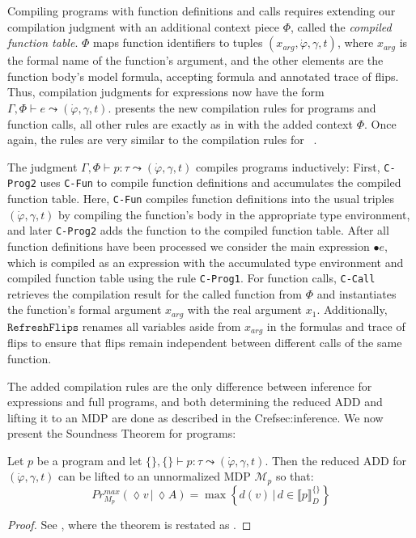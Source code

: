 %
Compiling programs with function definitions and calls requires extending our compilation judgment with an additional context piece $\Phi$, called the \textit{compiled function table}.
$\Phi$ maps function identifiers to tuples $(x_{arg}, \dot{\varphi}, \gamma, t)$, where $x_{arg}$ is the formal name of the function's argument, and the other elements are the function body's model formula, accepting formula and annotated trace of flips.
Thus, compilation judgments for expressions now have the form $\Gamma, \Phi \vdash e \leadsto (\dot{\varphi}, \gamma, t)$.
 presents the new compilation rules for programs and function calls, all other rules are exactly as in  with the added context $\Phi$.
Once again, the rules are very similar to the compilation rules for \DICE~\cite{holtzen2020scaling}.


The judgment $\Gamma, \Phi \vdash p  \colon \tau \leadsto (\dot{\varphi}, \gamma, t)$ compiles programs inductively:
First, \texttt{C-Prog2} uses \texttt{C-Fun} to compile function definitions and accumulates the compiled function table.
Here, \texttt{C-Fun} compiles function definitions into the usual triples $(\dot{\varphi}, \gamma, t)$ by compiling the function's body in the appropriate type environment, and later \texttt{C-Prog2} adds the function to the compiled function table.
After all function definitions have been processed we consider the main expression $\bullet e$, which is compiled as an expression with the accumulated type environment and compiled function table using the rule \texttt{C-Prog1}.
For function calls, \texttt{C-Call} retrieves the compilation result for the called function from $\Phi$ and instantiates the function's formal argument $x_{arg}$ with the real argument $x_1$.
Additionally, $\texttt{RefreshFlips}$ renames all variables aside from $x_{arg}$ in the formulas and trace of flips to ensure that flips remain independent between different calls of the same function.


The added compilation rules are the only difference between inference for expressions and full programs, and both determining the reduced ADD and lifting it to an MDP are done as described in the Cref{sec:inference}.
We now present the Soundness Theorem for \NDICE programs:
\begin{theorem}\label{ProgramSoundnessApp}
	Let $p$ be a \NDICE program  
	and let $\{\}, \{\} \vdash p \colon \tau \leadsto (\dot{\varphi}, \gamma, t)$. 
	Then the reduced ADD for $(\dot{\varphi}, \gamma, t)$ can be lifted to an unnormalized MDP $\mathcal{M}_p$ so that:
	$$ Pr^{max}_{M_p} (\lozenge v \,|\, \lozenge A) = \max \left\{d(v) \,|\, d \in \llbracket p\rrbracket^{\{\}}_D\right\}$$
\end{theorem}
\begin{proof}
	See , where the theorem is restated as .
\end{proof}
